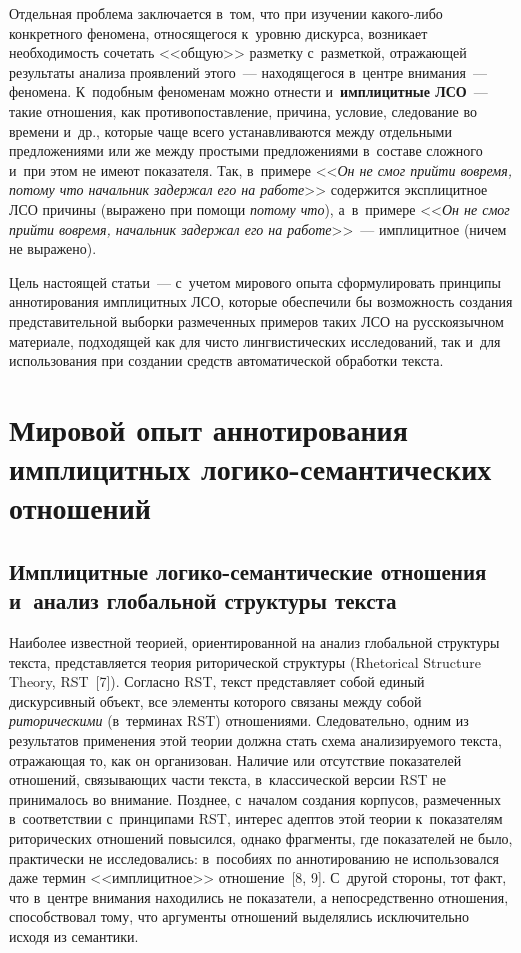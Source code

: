 \begin{multicols}{2}
Отдельная проблема заключается в~том, что при изучении ка\-ко\-го-ли\-бо 
конкретного феномена, относящегося к~уровню дискурса, возникает 
необходимость сочетать <<общую>> разметку с~разметкой, отражающей 
результаты анализа проявлений этого~--- находящегося в~центре  
внимания~--- феномена. К~подобным феноменам можно отнести 
и~\textbf{имплицитные ЛСО}~--- такие отношения, как противопоставление, причина, условие, 
следование во времени и~др., которые чаще всего устанавливаются между 
отдельными предложениями или же между простыми предложениями 
в~составе сложного и~при этом не имеют показателя. Так, в~примере 
<<\textit{Он не смог прийти вовремя, потому что начальник задержал его на 
работе}>> содержится эксплицитное ЛСО причины (выражено при помощи 
\textit{потому что}), а~в~примере <<\textit{Он не смог прийти вовремя, начальник 
задержал его на работе}>>~--- имплицитное (ничем не выражено).

Цель настоящей статьи~--- с~учетом мирового опыта сформулировать 
принципы аннотирования имплицитных ЛСО, которые обеспечили бы 
возможность создания представительной выборки размеченных примеров 
таких ЛСО на русскоязычном материале, подходящей как для чисто 
лингвистических исследований, так и~для использования при создании 
средств автоматической обработки \mbox{текста}.

\section{Мировой опыт аннотирования имплицитных логико-семантических отношений}

\subsection{Имплицитные логико-семантические отношения и~анализ глобальной структуры текста} 

Наиболее известной теорией, ориентированной на анализ глобальной 
структуры текста, пред\-став\-ля\-ет\-ся тео\-рия риторической структуры (Rhetorical 
Structure Theory, RST~[7]). Согласно RST, текст представляет собой единый 
дискурсивный объект, все элементы которого связаны между собой 
\textit{риторическими} (в~терминах RST) отношениями. Следовательно, 
одним из результатов применения этой теории должна стать схема 
анализируемого текста, отражающая то, как он организован. Наличие или 
отсутствие показателей отношений, связывающих части текста, 
в~классической версии RST не принималось во внимание. Позднее, 
с~началом создания корпусов, размеченных в~соответствии с~принципами 
RST, интерес адептов этой теории к~показателям риторических отношений 
повысился, однако фрагменты, где показателей не было, практически не 
исследовались: в~пособиях по аннотированию не использовался даже термин 
<<имплицитное>> отношение~[8, 9]. С~другой стороны, тот факт, что 
в~центре внимания находились не показатели, а непосредственно отношения, 
способствовал тому, что аргументы отношений выделялись исключительно 
исходя из семантики.


\end{multicols}
